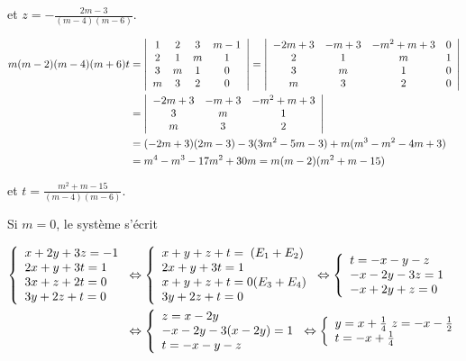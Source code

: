 {{et $z=-\frac{2m-3}{(m-4)(m-6)}$.

\begin{align*}\ensuremath
m(m-2)(m-4)(m+6)t&=\left|
\begin{array}{cccc}
1&2&3&m-1\\
2&1&m&1\\
3&m&1&0\\
m&3&2&0
\end{array}\right|=\left|
\begin{array}{cccc}
-2m+3&-m+3&-m^2+m+3&0\\
2&1&m&1\\
3&m&1&0\\
m&3&2&0
\end{array}\right|\\
 &=\left|
\begin{array}{ccc}
-2m+3&-m+3&-m^2+m+3\\
3&m&1\\
m&3&2
\end{array}\right|\\
 &=(-2m+3)(2m-3)-3(3m^2-5m-3)+m(m^3-m^2-4m+3)\\
 &=m^4-m^3-17m^2+30m=m(m-2)(m^2+m-15)
\end{align*}

et $t=\frac{m^2+m-15}{(m-4)(m-6)}$.

Si $m = 0$, le système s'écrit 

\begin{align*}\ensuremath
\left\{
\begin{array}{l}
x+2y+3z=-1\\
2x+y+3t=1\\
3x+z+2t=0\\
3y+2z+t=0
\end{array}
\right.&\Leftrightarrow\left\{
\begin{array}{l}
x+y+z+t=\;(E_1+E_2)\\
2x+y+3t=1\\
x+y+z+t=0(E_3+E_4)\\
3y+2z+t=0
\end{array}
\right.\Leftrightarrow\left\{
\begin{array}{l}
t=-x-y-z\\
-x-2y-3z=1\\
-x+2y+z=0
\end{array}
\right.
\\
 &\Leftrightarrow\left\{
\begin{array}{l}
z=x-2y\\
-x-2y-3(x-2y)=1\\
t=-x-y-z
\end{array}
\right.\Leftrightarrow\left\{
\begin{array}{l}
y=x+\frac{1}{4}\
z=-x-\frac{1}{2}\\
t=-x+\frac{1}{4}
\end{array}
\right.
\end{align*}

}}
